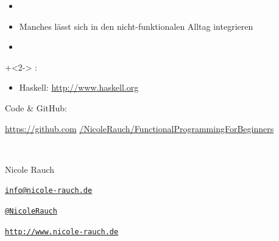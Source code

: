 \begin{frame}[fragile]{}
\begin{itemize}
\item {}
\item Manches lässt sich in den nicht-funktionalen Alltag integrieren
\item {}
\end{itemize}

\vfill

\onslide+<2->
:

\begin{itemize}
\item Haskell: \url{http://www.haskell.org}
\end{itemize}

\end{frame}




{
\begin{frame}{}

        Code \&  GitHub:
        \begin{center}
                \url{https://github.com} \url{/NicoleRauch/FunctionalProgrammingForBeginners}
        \end{center}

        ~\\[1em]
        \begin{block}{Nicole Rauch}
        \begin{description}[Twitterxx]
                \item[E-Mail]  \href{mailto:info@nicole-rauch.de}{\texttt{info@nicole-rauch.de}}
                \item[Twitter] \href{http://twitter.com/NicoleRauch}{\texttt{@NicoleRauch}}
                \item[Web] \href{http://www.nicole-rauch.de}{\texttt{http://www.nicole-rauch.de}}
        \end{description}
        \end{block}
\end{frame}
}
